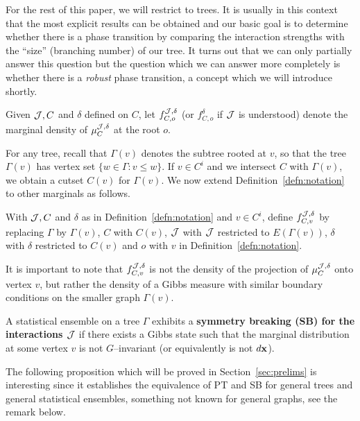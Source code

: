 For the rest of this paper, we will restrict to trees.  It is usually 
in this context that the most explicit results can be obtained and our 
basic goal is to determine whether there is a phase transition by comparing 
the interaction strengths with the ``size'' (branching number) of our tree. 
It turns out that we can only 
partially answer this question but the question which we can answer more
completely is whether there is a {\it robust} phase transition, a concept 
which we will introduce shortly.

\begin{defn} \label{defn:notation}
Given ${\cal J},C$ and $\delta$ defined on $C$, let
$f^{{\cal J},\delta}_{C , o}$ 
(or $f^{\delta}_{C , o}$ if ${\cal J}$ is understood)
denote the marginal density of $\mu^{{\cal J} , \delta}_{C}$ at the root $o$.  
\end{defn}

For any tree, recall that $\Gamma (v)$ denotes the subtree 
rooted at $v$, so that the tree $\Gamma(v)$ has vertex set 
$\{ w \in \Gamma : v \leq w\}$. If $v\in C^i$ and
we intersect $C$ with $\Gamma (v)$, we obtain a cutset $C(v)$ for $\Gamma(v)$.
We now extend Definition~\ref{defn:notation} to other marginals as follows.

\begin{defn} \label{defn:marginals}
With ${\cal J},C$ and $\delta$ as in Definition~\ref{defn:notation} and $v \in C^i$, 
define $f_{C,v}^{{\cal J} , \delta}$ 
by replacing $\Gamma$ by $\Gamma (v)$, $C$ with $C(v)$, ${\cal J}$ with
${\cal J}$ restricted to $E (\Gamma (v))$, $\delta$ with $\delta$ restricted
to $C(v)$ and $o$ with $v$ in Definition~\ref{defn:notation}.  
\end{defn}

It is important to note that $f_{C,v}^{{\cal J},\delta}$ is not the density 
of the projection of $\mu_C^{{\cal J},\delta}$ onto vertex $v$, but rather
the density of a Gibbs measure with similar boundary conditions
on the smaller graph $\Gamma (v)$.

\begin{defn} \label{defn:SB}
A statistical ensemble on a tree $\Gamma$ exhibits a 
{\bf symmetry breaking (SB) for the interactions ${\cal J}$} 
if there exists a Gibbs state such that the marginal distribution at some
vertex $v$ is not $G$--invariant (or equivalently is not $d{\bf x}$).
\end{defn}

The following proposition which will be proved in Section~\ref{sec:prelims} 
is interesting since it establishes the equivalence of PT and SB for
general trees and general statistical ensembles, something not known for 
general graphs, see the remark below.

